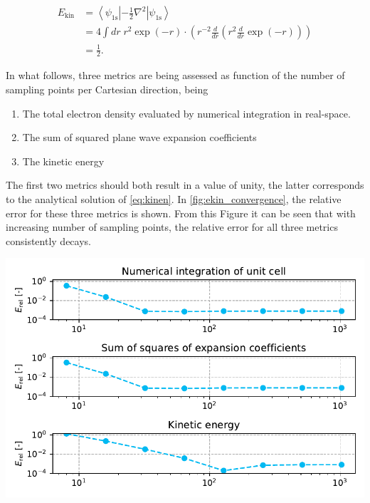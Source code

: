 \begin{align}
    E_{\text{kin}} &= \left<\psi_{\text{1s}} \left| -\frac{1}{2} \nabla^{2} \right| \psi_{\text{1s}}\right> \\
    &= 4 \int dr \; r^{2} \exp \left( -r \right) \cdot \left(r^{-2} \frac{d}{dr} \left( r^{2} \frac{d}{dr} \exp \left( -r \right)\right)\right) \\
    &= \frac{1}{2}. \label{eq:kinen}
\end{align}

In what follows, three metrics are being assessed as function of the number of sampling points per Cartesian direction, being

\begin{enumerate}
    \item The total electron density evaluated by numerical integration in real-space.
    \item The sum of squared plane wave expansion coefficients
    \item The kinetic energy
\end{enumerate}

The first two metrics should both result in a value of unity, the latter corresponds to the analytical solution of \cref{eq:kinen}. In \cref{fig:ekin_convergence}, the relative error for these three metrics is shown. From this Figure it can be seen that with increasing number of sampling points, the relative error for all three metrics consistently decays.

\begin{Figure}
    \centering
    \includegraphics[width=\linewidth]{img/fig4_ekin_convergence.pdf}
    \label{fig:ekin_convergence}
\end{Figure}


